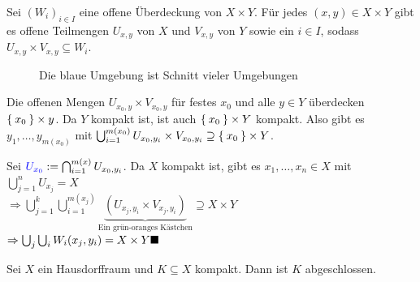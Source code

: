 \begin{beweis}
    Sei $(W_i)_{i \in I}$ eine offene Überdeckung von $X \times Y$.
    Für jedes $(x,y) \in X \times Y$ gibt es offene Teilmengen
    $U_{x,y}$ von $X$ und $V_{x,y}$ von $Y$ sowie ein $i \in I$, sodass
    $U_{x,y} \times V_{x,y} \subseteq W_i$.

    \begin{figure}[htp]
        \centering
        
        \caption{Die blaue Umgebung ist Schnitt vieler Umgebungen}
    \end{figure}

    Die offenen Mengen $U_{x_0, y} \times V_{x_0, y}$ für festes $x_0$
    und alle $y \in Y$ überdecken $\Set{x_0} \times y$. Da $Y$ kompakt
    ist, ist auch $\Set{x_0} \times Y$ kompakt. Also gibt es 
    $y_1, \dots, y_{m(x_0)}$ mit 
    $\bigcup_{i=1}^{m(x_0)} U_{x_0, y_i} \times V_{x_0, y_i} \supseteq \Set{x_0} \times Y$.

    Sei ${\color{blue} U_{x_0}} := \bigcap_{i=1}^{m(x)} U_{x_0, y_i}$.
    Da $X$ kompakt ist, gibt es $x_1, \dots, x_n \in X$ mit 
    $\bigcup_{j=1}^n U_{x_j} = X$\\
    $\Rightarrow \bigcup_{j=1}^k \bigcup_{i=1}^{m(x_j)} \underbrace{\left ( U_{x_j, y_i} \times V_{x_j, y_i} \right)}_{\text{Ein grün-oranges Kästchen}} \supseteq X \times Y$\\
    $\Rightarrow \bigcup_j \bigcup_i W_i (x_j, y_i) = X \times Y \qed$
\end{beweis}

\begin{korollar}\label{hausdorffraumKompakteTeilmengeAbgeschlossen}
    Sei $X$ ein Hausdorffraum und $K \subseteq X$ kompakt.
    Dann ist $K$ abgeschlossen.
\end{korollar}


